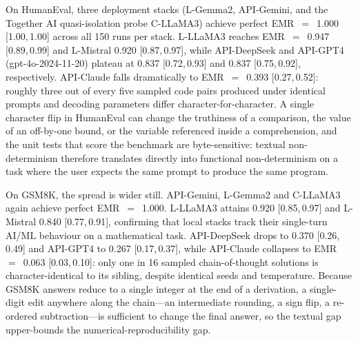\documentclass[sn-nature]{sn-jnl}
\begin{document}
On HumanEval, three deployment stacks (L-Gemma2, API-Gemini, and the Together AI quasi-isolation probe C-LLaMA3) achieve perfect EMR~$=$~1.000 [1.00,\,1.00] across all 150 runs per stack.
L-LLaMA3 reaches EMR~$=$~0.947 [0.89,\,0.99] and L-Mistral 0.920 [0.87,\,0.97], while API-DeepSeek and API-GPT4 (gpt-4o-2024-11-20) plateau at 0.837 [0.72,\,0.93] and 0.837 [0.75,\,0.92], respectively.
API-Claude falls dramatically to EMR~$=$~0.393 [0.27,\,0.52]: roughly three out of every five sampled code pairs produced under identical prompts and decoding parameters differ character-for-character.
A single character flip in HumanEval can change the truthiness of a comparison, the value of an off-by-one bound, or the variable referenced inside a comprehension, and the unit tests that score the benchmark are byte-sensitive: textual non-determinism therefore translates directly into functional non-determinism on a task where the user expects the same prompt to produce the same program.

On GSM8K, the spread is wider still.
API-Gemini, L-Gemma2 and C-LLaMA3 again achieve perfect EMR~$=$~1.000.
L-LLaMA3 attains 0.920 [0.85,\,0.97] and L-Mistral 0.840 [0.77,\,0.91], confirming that local stacks track their single-turn AI/ML behaviour on a mathematical task.
API-DeepSeek drops to 0.370 [0.26,\,0.49] and API-GPT4 to 0.267 [0.17,\,0.37], while API-Claude collapses to EMR~$=$~0.063 [0.03,\,0.10]: only one in 16 sampled chain-of-thought solutions is character-identical to its sibling, despite identical seeds and temperature.
Because GSM8K answers reduce to a single integer at the end of a derivation, a single-digit edit anywhere along the chain---an intermediate rounding, a sign flip, a re-ordered subtraction---is sufficient to change the final answer, so the textual gap upper-bounds the numerical-reproducibility gap.
\end{document}
